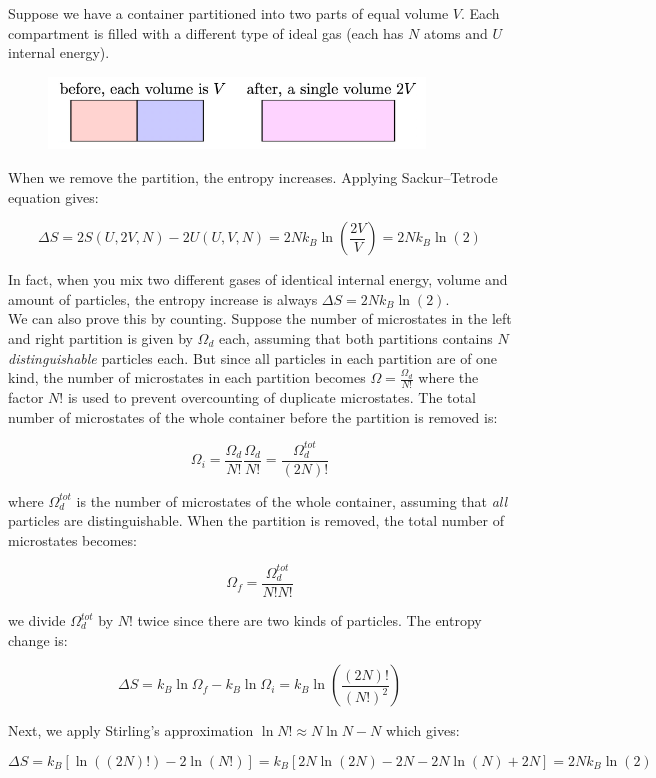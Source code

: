 Suppose we have a container partitioned into two parts of equal volume $V$. Each compartment is filled with a different type of ideal gas (each has $N$ atoms and $U$ internal energy).

\begin{figure}[H]
	\centering
	\includegraphics[width=100mm]{38.png}
\end{figure}

When we remove the partition, the entropy increases. Applying Sackur–Tetrode equation gives:

\[\Delta S=2S(U,2V,N)-2U(U,V,N)=2Nk_B\ln\left(\frac{2V}{V}\right)=2Nk_B\ln(2)\]

In fact, when you mix two different gases of identical internal energy, volume and amount of particles, the entropy increase is always $\Delta S=2Nk_B\ln(2)$. \\

We can also prove this by counting. Suppose the number of microstates in the left and right partition is given by $\Omega_d$ each, assuming that both partitions contains $N$ \textit{distinguishable} particles each. But since all particles in each partition are of one kind, the number of microstates in each partition becomes $\Omega=\frac{\Omega_d}{N!}$ where the factor $N!$ is used to prevent overcounting of duplicate microstates. The total number of microstates of the whole container before the partition is removed is:

\[\Omega_i=\frac{\Omega_d}{N!}\frac{\Omega_d}{N!}=\frac{\Omega_d^{tot}}{(2N)!}\]

where $\Omega_d^{tot}$ is the number of microstates of the whole container, assuming that \textit{all} particles are distinguishable. When the partition is removed, the total number of microstates becomes:

\[\Omega_f=\frac{\Omega_d^{tot}}{N!N!}\]

we divide $\Omega_d^{tot}$ by $N!$ twice since there are two kinds of particles. The entropy change is:

\[\Delta S=k_B\ln\Omega_f-k_B\ln\Omega_i=k_B\ln\left(\frac{(2N)!}{(N!)^2}\right)\]

Next, we apply Stirling's approximation $\ln N!\approx N\ln N-N$ which gives:

\[\Delta S=k_B\left[ \ln\left((2N)!\right)-2\ln(N!) \right]=k_B\left[ 2N\ln(2N)-2N-2N\ln(N)+2N \right]=2Nk_B\ln(2)\]

